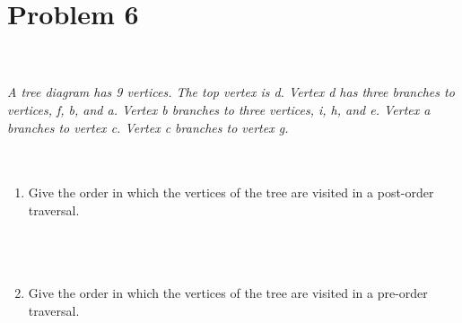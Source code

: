 \documentclass{amsart}
\theoremstyle{definition}
\theoremstyle{Exercise}
\theoremstyle{remark}
\theoremstyle{rule}
\numberwithin{equation}{section}
\begin{document}
 \newpage

\section*{Problem 6}

\\\\
{\color{blue}{\bf Figure 14:} \emph{A tree diagram has 9 vertices. The top vertex is d. Vertex d has three branches to vertices, f, b, and a. Vertex b branches to three vertices, i, h, and e. Vertex a branches to vertex c. Vertex c branches to vertex g.
\\
}
}
\\
\\
\begin{enumerate}[label=(\alph*)]
\item Give the order in which the vertices of the tree are visited in a post-order traversal.\\\\
\\\\
\item Give the order in which the vertices of the tree are visited in a pre-order traversal.\\\\
\\\\
\end{enumerate}


 \newpage
\end{document}
